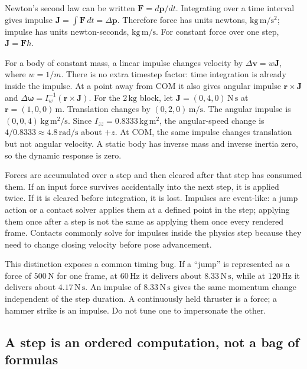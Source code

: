 Newton's second law can be written \(\mathbf F=d\mathbf p/dt\). Integrating over a time interval gives impulse \(\mathbf J=\int\mathbf F\,dt=\Delta\mathbf p\). Therefore force has units newtons, \(\mathrm{kg\,m/s^2}\); impulse has units newton-seconds, \(\mathrm{kg\,m/s}\). For constant force over one step, \(\mathbf J=\mathbf Fh\).

For a body of constant mass, a linear impulse changes velocity by \(\Delta\mathbf v=w\mathbf J\), where \(w=1/m\). There is no extra timestep factor: time integration is already inside the impulse. At a point away from COM it also gives angular impulse \(\mathbf r\times\mathbf J\) and \(\Delta\boldsymbol\omega=I_w^{-1}(\mathbf r\times\mathbf J)\). For the \(2\,\mathrm{kg}\) block, let \(\mathbf J=(0,4,0)\,\mathrm{N\,s}\) at \(\mathbf r=(1,0,0)\,\mathrm m\). Translation changes by \((0,2,0)\,\mathrm{m/s}\). The angular impulse is \((0,0,4)\,\mathrm{kg\,m^2/s}\). Since \(I_{zz}=0.8333\,\mathrm{kg\,m^2}\), the angular-speed change is \(4/0.8333\approx4.8\,\mathrm{rad/s}\) about \(+z\). At COM, the same impulse changes translation but not angular velocity. A static body has inverse mass and inverse inertia zero, so the dynamic response is zero.

Forces are accumulated over a step and then cleared after that step has consumed them. If an input force survives accidentally into the next step, it is applied twice. If it is cleared before integration, it is lost. Impulses are event-like: a jump action or a contact solver applies them at a defined point in the step; applying them once after a step is not the same as applying them once every rendered frame. Contacts commonly solve for impulses inside the physics step because they need to change closing velocity before pose advancement.

This distinction exposes a common timing bug. If a ``jump'' is represented as a force of \(500\,\mathrm N\) for one frame, at \(60\,\mathrm{Hz}\) it delivers about \(8.33\,\mathrm{N\,s}\), while at \(120\,\mathrm{Hz}\) it delivers about \(4.17\,\mathrm{N\,s}\). An impulse of \(8.33\,\mathrm{N\,s}\) gives the same momentum change independent of the step duration. A continuously held thruster is a force; a hammer strike is an impulse. Do not tune one to impersonate the other.

\subsection{A step is an ordered computation, not a bag of formulas}\label{06-engine-ii-ch034-a-step-is-an-ordered-computation-not-a-bag-of-formulas}

